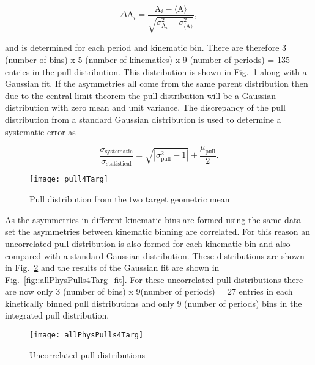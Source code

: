 \begin{equation}
  \label{eq::pull}
  \Delta\mathrm{A}_i =
  \frac{
    \mathrm{A}_i - \langle \mathrm{A} \rangle
  }{
    \sqrt{
      \sigma^2_{\mathrm{A}_i} - \sigma^2_{\langle \mathrm{A} \rangle}
    }
  },
\end{equation}

\noindent
and is determined for each period and kinematic bin.  There are therefore 3
(number of bins) x 5 (number of kinematics) x 9 (number of periods) = 135
entries in the pull distribution. This distribution is shown in
Fig.~\ref{fig::pull4Targ} along with a Gaussian fit.  If the asymmetries all
come from the same parent distribution then due to the central limit theorem the
pull distribution will be a Gaussian distribution with zero mean and unit
variance.  The discrepancy of the pull distribution from a standard Gaussian
distribution is used to determine a systematic error as

\begin{equation}
  \label{equ::sysErrorPull}
  \frac{\sigma_{\mathrm{systematic}}}{\sigma_{\mathrm{statistical}}} =
  \sqrt{|\sigma^2_{\mathrm{pull}} - 1|} + \frac{\mu_{\mathrm{pull}}}{2}.
\end{equation}

\begin{figure}[h!t]
  \begin{center}
    \texttt{[image: pull4Targ]}
    \caption{Pull distribution from the two target geometric mean}
    \label{fig::pull4Targ}
  \end{center}
\end{figure}

\noindent
As the asymmetries in different kinematic bins are formed using the same data
set the asymmetries between kinematic binning are correlated.  For this reason
an uncorrelated pull distribution is also formed for each kinematic bin and also
compared with a standard Gaussian distribution.  These distributions are shown
in Fig.~\ref{fig::allPhysPulls4Targ} and the results of the Gaussian fit are
shown in Fig.~\ref{fig::allPhysPulls4Targ_fit}.  For these uncorrelated pull
distributions there are now only 3 (number of bins) x 9(number of periods) = 27
entries in each kinetically binned pull distributions and only 9 (number of
periods) bins in the integrated pull distribution.

\begin{figure}[h!t]
  \begin{center}
    \texttt{[image: allPhysPulls4Targ]}
    \caption{Uncorrelated pull distributions}
    \label{fig::allPhysPulls4Targ}
  \end{center}
\end{figure}

